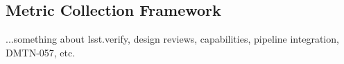 \subsection{Metric Collection Framework}
\label{sec:comp:verify}

...something about lsst.verify, design reviews, capabilities, pipeline
integration, DMTN-057, etc.
